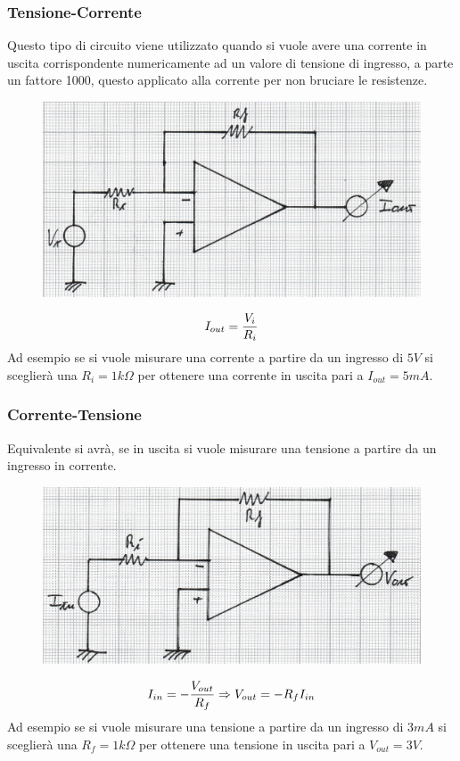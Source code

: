 \documentclass[a4paper, 15pt]{article}
\begin{document}
\subsubsection{Tensione-Corrente}
\begin{adjustwidth}{2in}{}      		
   		Questo tipo di circuito viene utilizzato quando si vuole avere una corrente in uscita corrispondente numericamente ad un valore di tensione di ingresso, a parte un fattore 1000, questo applicato alla corrente per non bruciare le resistenze. 
\begin{figure}[H]
	\centering
	\includegraphics[width=0.5\linewidth]{immagini/mm(14)}
	\label{fig:mm14}
\end{figure}
   		\[I_{out} = {V_i\over R_i}\]   		
   		Ad esempio se si vuole misurare una corrente a partire da un ingresso di $5 V$ si sceglierà una $R_i = 1k\Omega$ per ottenere una corrente in uscita pari a $I_{out} = 5 mA$.  
\end{adjustwidth}
\subsubsection{Corrente-Tensione}
\begin{adjustwidth}{2in}{} 
   		Equivalente si avrà, se in uscita si vuole misurare una tensione a partire da un ingresso in corrente.    		
   		\begin{figure}[H]
   			\centering
   			\includegraphics[width=0.5\linewidth]{immagini/mm(15)}
   			\label{fig:mm15}
   		\end{figure}   		
   		\[I_{in} = -{V_{out}\over R_f} \Rightarrow V_{out} = -R_fI_{in}\]   		
   		Ad esempio se si vuole misurare una tensione a partire da un ingresso di $3 mA$ si sceglierà una $R_f = 1k\Omega$ per ottenere una tensione in uscita pari a $V_{out} = 3 V$.  
\end{adjustwidth}
\newpage
\end{document}
